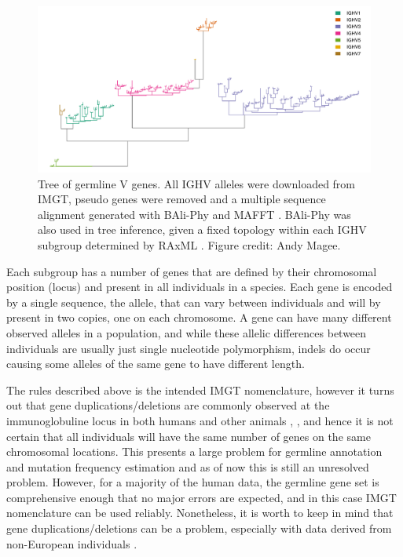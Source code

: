 \begin{figure}
    \centering
    \includegraphics[width=1\textwidth]{figures/tree_right_side_up.pdf}
    \caption{
        \label{fig:IGHV_tree}
        Tree of germline V genes.
        All IGHV alleles were downloaded from IMGT, pseudo genes were removed and a multiple sequence alignment generated with BAli-Phy \cite{suchard2006bali} and MAFFT \cite{katoh2013mafft}.
        BAli-Phy was also used in tree inference, given a fixed topology within each IGHV subgroup determined by RAxML \cite{stamatakis2008rapid}.
        Figure credit: Andy Magee.
    }
\end{figure}


Each subgroup has a number of genes that are defined by their chromosomal position (locus) and present in all individuals in a species.
Each gene is encoded by a single sequence, the allele, that can vary between individuals and will by present in two copies, one on each chromosome.
A gene can have many different observed alleles in a population, and while these allelic differences between individuals are usually just single nucleotide polymorphism, indels do occur causing some alleles of the same gene to have different length.

The rules described above is the intended IMGT nomenclature, however it turns out that gene duplications/deletions are commonly observed at the immunoglobuline locus in both humans \cite{scheepers2015ability} and other animals \cite{collins2015mouse}, \cite{corcoran2016production}, and hence it is not certain that all individuals will have the same number of genes on the same chromosomal locations.
This presents a large problem for germline annotation and mutation frequency estimation and as of now this is still an unresolved problem.
However, for a majority of the human data, the germline gene set is comprehensive enough that no major errors are expected, and in this case IMGT nomenclature can be used reliably.
Nonetheless, it is worth to keep in mind that gene duplications/deletions can be a problem, especially with data derived from non-European individuals \cite{scheepers2015ability}.








